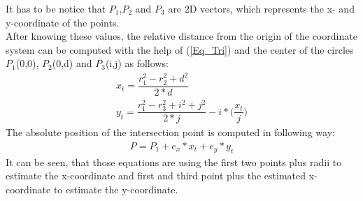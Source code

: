 It has to be notice that $P_1$,$P_2$  and $P_3$ are 2D vectors, which represents the x- and y-coordinate of the points.\\ 
After knowing these values, the relative distance from the origin of the coordinate system can be computed with the help of (\ref{Eq_Tri}) and the center of the circles $P_1$(0,0), $P_2$(0,d) and $P_3$(i,j) as follows:
\begin{align}
x_t = \dfrac{r_1^2 - r_2^2 + d^2}{2*d} \\
y_t = \dfrac{r_1^2 - r_3^2 + i^2 + j^2}{2*j} - i* \bigg(\dfrac{x_t}{j}\bigg) 
\end{align}
The absolute position of the intersection point is computed in following way:
\begin{align}
P = P_1 + e_x * x_t + e_y * y_t 
\end{align}
It can be seen, that those equations are using the first two points plus radii to estimate the x-coordinate and first and third point plus the estimated x-coordinate to estimate the y-coordinate.\\ 
